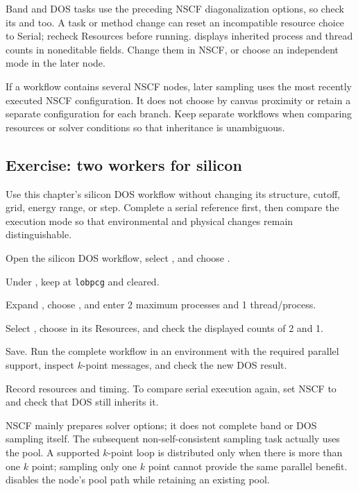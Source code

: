 Band and DOS tasks use the preceding NSCF diagonalization options, so check its  and  too. A task or method change can reset an incompatible resource choice to Serial; recheck Resources before running.  displays inherited process and thread counts in noneditable fields. Change them in NSCF, or choose an independent mode in the later node.

If a workflow contains several NSCF nodes, later sampling uses the most recently executed NSCF configuration. It does not choose by canvas proximity or retain a separate configuration for each branch. Keep separate workflows when comparing resources or solver conditions so that inheritance is unambiguous.

\subsection{Exercise: two workers for silicon }

Use this chapter's silicon DOS workflow without changing its structure, cutoff, grid, energy range, or step. Complete a serial reference first, then compare the execution mode so that environmental and physical changes remain distinguishable.

\begin{steps}
\item Open the silicon DOS workflow, select , and choose .
\item Under , keep  at \texttt{lobpcg} and  cleared.
\item Expand , choose , and enter 2 maximum processes and 1 thread/process.
\item Select , choose  in its Resources, and check the displayed counts of 2 and 1.
\item Save. Run the complete workflow in an environment with the required parallel support, inspect $k$-point messages, and check the new DOS result.
\item Record resources and timing. To compare serial execution again, set NSCF to  and check that DOS still inherits it.
\end{steps}

NSCF mainly prepares solver options; it does not complete band or DOS sampling itself. The subsequent non-self-consistent sampling task actually uses the pool. A supported $k$-point loop is distributed only when there is more than one $k$ point; sampling only one $k$ point cannot provide the same parallel benefit.  disables the node's pool path while retaining an existing pool.

